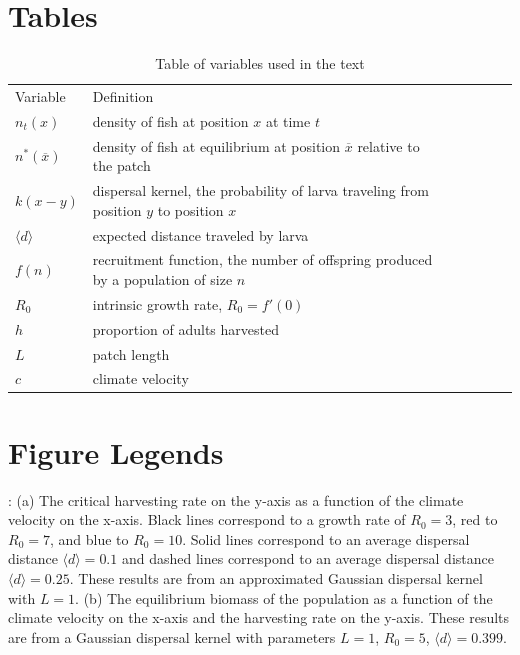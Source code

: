 \documentclass[12pt,english]{article}
\begin{document}
\begin{spacing}{1.9}
\section{Tables}
\begin{table}[h]
\caption{Table of variables used in the text}
\begin{tabular}{@{}lllllll@{}}
  Variable & Definition
\\\cmidrule{1-1} \cmidrule{2-2}   
$n_t(x)$ & density of fish at position $x$ at time $t$
\\ $n^*(\overline{x})$ & density of fish at equilibrium at position $\overline{x}$ relative to the patch 
\\ $k(x-y)$ & dispersal kernel, the probability of larva traveling from position $y$ to position $x$
\\ $\langle d \rangle $ & expected distance traveled by larva
\\ $f(n)$ & recruitment function, the number of offspring produced by a population of size $n$
\\ $R_0$ & intrinsic growth rate, $R_0=f'(0)$
\\ $h$ & proportion of adults harvested
\\ $L$ & patch length
\\ $c$ & climate velocity
\end{tabular}
\label{variables}
\end{table}

\pagebreak


\section*{Figure Legends}

: (a) The critical harvesting rate on the y-axis as a function of the climate velocity on the x-axis.  Black lines correspond to a growth rate of $R_0=3$, red to $R_0=7$, and blue to $R_0=10$.  Solid lines correspond to an average dispersal distance $\langle d \rangle =0.1$ and dashed lines correspond to an average dispersal distance $\langle d \rangle =0.25$.  These results are from an approximated Gaussian dispersal kernel with $L=1$.  (b) 
The equilibrium biomass of the population as a function of the climate velocity on the x-axis and the harvesting rate on the y-axis. These results are from a Gaussian dispersal kernel with parameters $L=1$, $R_0=5$, $\langle d \rangle = 0.399$. 
\hspace{6in}
\hspace{6in}


\end{spacing}
\end{document}
